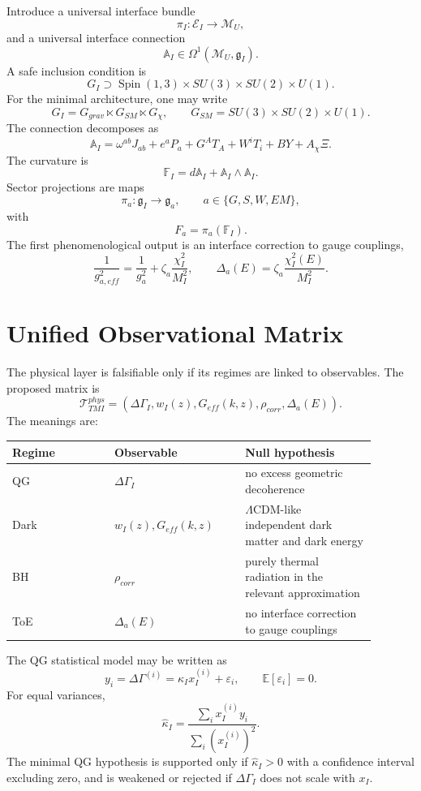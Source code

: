 \documentclass[12pt,a4paper]{article}
\DeclareMathOperator{\Spin}{Spin}
\newcommand{\M}{\mathcal M_U}
\newcommand{\Acal}{\mathbb A_I}
\newcommand{\Fcal}{\mathbb F_I}
\newcommand{\eps}{\varepsilon}
\begin{document}
Introduce a universal interface bundle
\[
\boxed{\pi_I:\mathcal E_I\to\M,}
\]
and a universal interface connection
\[
\boxed{\Acal\in\Omega^1(\M,\mathfrak g_I).}
\]
A safe inclusion condition is
\[
\boxed{G_I\supset \Spin(1,3)\times SU(3)\times SU(2)\times U(1).}
\]
For the minimal architecture, one may write
\[
\boxed{
G_I=G_{grav}\ltimes G_{SM}\ltimes G_\chi,
\qquad
G_{SM}=SU(3)\times SU(2)\times U(1).
}
\]
The connection decomposes as
\[
\boxed{
\Acal=\omega^{ab}J_{ab}+e^aP_a+G^AT_A+W^iT_i+BY+A_\chi\Xi.
}
\]
The curvature is
\[
\boxed{\Fcal=d\Acal+\Acal\wedge\Acal.}
\]
Sector projections are maps
\[
\boxed{\pi_a:\mathfrak g_I\to\mathfrak g_a,
\qquad a\in\{G,S,W,EM\},}
\]
with
\[
\boxed{F_a=\pi_a(\Fcal).}
\]
The first phenomenological output is an interface correction to gauge couplings,
\[
\boxed{
\frac{1}{g_{a,eff}^2}=\frac{1}{g_a^2}+\zeta_a\frac{\chi_I^2}{M_I^2},
\qquad
\Delta_a(E)=\zeta_a\frac{\chi_I^2(E)}{M_I^2}.
}
\]

\section{Unified Observational Matrix}
The physical layer is falsifiable only if its regimes are linked to observables. The proposed matrix is
\[
\boxed{
\mathcal T_{TMI}^{phys}
=
\left(
\Delta\Gamma_I,
 w_I(z),
 G_{eff}(k,z),
 \rho_{corr},
 \Delta_a(E)
\right).
}
\]
The meanings are:
\begin{longtable}{p{0.25\linewidth}p{0.32\linewidth}p{0.32\linewidth}}
\toprule
Regime & Observable & Null hypothesis \\
\midrule
QG & $\Delta\Gamma_I$ & no excess geometric decoherence \\
Dark & $w_I(z),G_{eff}(k,z)$ & $\Lambda$CDM-like independent dark matter and dark energy \\
BH & $\rho_{corr}$ & purely thermal radiation in the relevant approximation \\
ToE & $\Delta_a(E)$ & no interface correction to gauge couplings \\
\bottomrule
\end{longtable}

The QG statistical model may be written as
\[
\boxed{
y_i=\Delta\Gamma^{(i)}=\kappa_Ix_I^{(i)}+\eps_i,
\qquad
\mathbb E[\eps_i]=0.
}
\]
For equal variances,
\[
\boxed{
\widehat\kappa_I=\frac{\sum_i x_I^{(i)}y_i}{\sum_i(x_I^{(i)})^2}.
}
\]
The minimal QG hypothesis is supported only if $\widehat\kappa_I>0$ with a confidence interval excluding zero, and is weakened or rejected if $\Delta\Gamma_I$ does not scale with $x_I$.
\end{document}
